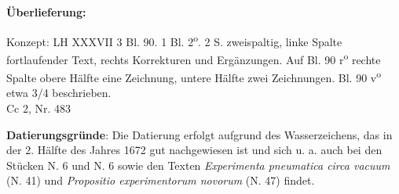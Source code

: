       
               
                \begin{ledgroupsized}[r]{120mm}
                \footnotesize 
                \pstart                
                \noindent\textbf{\"{U}berlieferung:}   
                \pend
                \end{ledgroupsized}
            
              
                            \begin{ledgroupsized}[r]{114mm}
                            \footnotesize 
                            \pstart \parindent -6mm
                            Konzept: LH XXXVII 3 Bl. 90. 1 Bl. 2\textsuperscript{o}. 2 S. zweispaltig, linke Spalte fortlaufender Text, rechts Korrekturen und Erg\"{a}nzungen. Auf Bl. 90 r\textsuperscript{o} rechte Spalte obere H\"{a}lfte eine Zeichnung, untere H\"{a}lfte zwei Zeichnungen. Bl. 90 v\textsuperscript{o} etwa 3/4 beschrieben.\\Cc 2, Nr. 483 \pend
                            \end{ledgroupsized}
                \vspace*{5mm}
                \begin{ledgroup}
                \footnotesize 
                \pstart
            \noindent\footnotesize{\textbf{Datierungsgr\"{u}nde}: Die Datierung erfolgt aufgrund des Wasserzeichens, das in der 2. H\"{a}lfte des Jahres 1672 gut nachgewiesen ist und sich u. a. auch bei den St\"{u}cken N. 6\raisebox{-0.5ex}{\notsotiny 1} und N. 6\raisebox{-0.5ex}{\notsotiny 2} sowie den Texten \textit{Experimenta pneumatica circa vacuum} (N. 41) und \textit{Propositio experimentorum novorum} \cite{00266}(N. 47) findet.}
                \pend
                \end{ledgroup}
                \vspace*{8mm}  
                \normalsize

